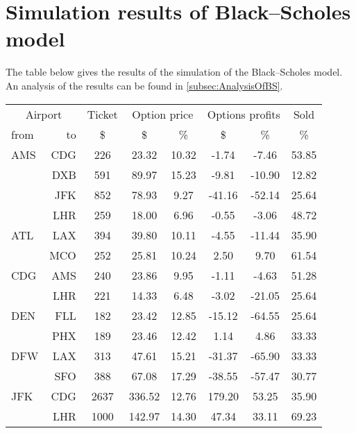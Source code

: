 \chapter{Simulation results of Black--Scholes model}
\label{app:SimulationResultsBS}
The table below gives the results of the simulation of the Black--Scholes model. An analysis of the results can be found in \autoref{subsec:AnalysisOfBS}.
\\[2em]
\begin{table}[h]
    \begin{center}
        \begin{tabular}{l r c c c c c c}
            \toprule
            \multicolumn{2}{c}{Airport}  &  Ticket & \multicolumn{2}{c}{Option price} & \multicolumn{2}{c}{Options profits}  &  Sold  \\[.4ex]
            from  &  to  &  \$   &  \$  & \%  &  \$  & \%  & \%  \\
            \midrule
AMS  &  CDG  &     226  &   23.32  &  10.32  &   -1.74  &   -7.46  &   53.85 \\
~    &  DXB  &     591  &   89.97  &  15.23  &   -9.81  &  -10.90  &   12.82 \\
~    &  JFK  &     852  &   78.93  &   9.27  &  -41.16  &  -52.14  &   25.64 \\
~    &  LHR  &     259  &   18.00  &   6.96  &   -0.55  &   -3.06  &   48.72 \\[.5ex]
ATL  &  LAX  &     394  &   39.80  &  10.11  &   -4.55  &  -11.44  &   35.90 \\
~    &  MCO  &     252  &   25.81  &  10.24  &    2.50  &    9.70  &   61.54 \\[.5ex]
CDG  &  AMS  &     240  &   23.86  &   9.95  &   -1.11  &   -4.63  &   51.28 \\
~    &  LHR  &     221  &   14.33  &   6.48  &   -3.02  &  -21.05  &   25.64 \\[.5ex]
DEN  &  FLL  &     182  &   23.42  &  12.85  &  -15.12  &  -64.55  &   25.64 \\
~    &  PHX  &     189  &   23.46  &  12.42  &    1.14  &    4.86  &   33.33 \\[.5ex]
DFW  &  LAX  &     313  &   47.61  &  15.21  &  -31.37  &  -65.90  &   33.33 \\
~    &  SFO  &     388  &   67.08  &  17.29  &  -38.55  &  -57.47  &   30.77 \\[.5ex]
JFK  &  CDG  &    2637  &  336.52  &  12.76  &  179.20  &   53.25  &   35.90 \\
~    &  LHR  &    1000  &  142.97  &  14.30  &   47.34  &   33.11  &   69.23 \\[.5ex]

\end{tabular}
\end{center}
\end{table}
